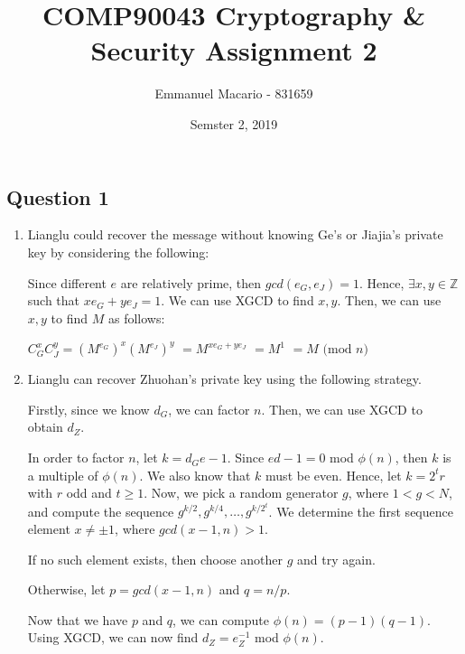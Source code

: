 \documentclass[12pt]{article}
\author{Emmanuel Macario - 831659}
\title{COMP90043 Cryptography \& Security Assignment 2}
\date{Semster 2, 2019}
\begin{document}
\maketitle

\subsection*{Question 1}

\begin{enumerate}
\item Lianglu could recover the message without knowing Ge's or Jiajia's private key by considering the following:

Since different $e$ are relatively prime, then $gcd(e_{G}, e_{J})=1$. Hence, $\exists x, y \in \mathbb{Z}$ such 
that $xe_{G}+ye_{J}=1$. We can use XGCD to find $x, y$. Then, we can use $x,y$ to find $M$ as follows:


\begin{center}
$C_{G}^{x} C_{J}^{y} = (M^{e_{G}})^{x} (M^{e_{J}})^{y}$
$                                  = M^{{x e_{G}}+{y e_{J}}}$
$                                  = M^{1}$
$                                  = M \text{ (mod }n)$

\end{center}

\item Lianglu can recover Zhuohan's private key using the following strategy.

Firstly, since we know $d_{G}$, we can factor $n$. Then, we can use XGCD to obtain $d_{Z}$.

In order to factor $n$, let $k=d_{G}e - 1$. Since $ed-1 = 0$ mod $\phi (n)$, then $k$ is a multiple of $\phi (n)$. 
We also know that $k$ must be even. Hence, let $k=2^{t}r$ with $r$ odd and $t \geq 1$. Now, we pick a random
generator $g$, where $1 < g < N$, and compute the sequence $g^{k/2}, g^{k/4}, \dots, g^{k/2^{t}}$. We determine
the first sequence element $x \neq \pm 1$, where $gcd(x-1, n) > 1$.

If no such element exists, then choose another $g$ and try again.

Otherwise, let $p = gcd(x-1, n)$ and $q = n/p$.


Now that we have $p$ and $q$, we can compute $\phi (n) = (p-1)(q-1)$. Using XGCD, we can now find
$d_{Z} = e_{Z}^{-1}$ mod $\phi (n)$.


\end{enumerate}


\end{document}
